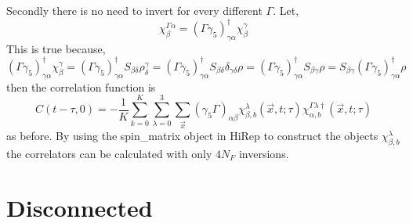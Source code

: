 \documentclass[3p,preprint]{elsarticle}
\begin{document}
Secondly there is no need to invert for every different $\Gamma$.
Let,
\begin{equation}
\chi^{\Gamma \alpha}_\beta = (\Gamma \gamma_5)^\dagger_{\gamma \alpha} \chi^{\gamma}_\beta
\end{equation}
This is true because,
\begin{equation}
(\Gamma \gamma_5)^\dagger_{\gamma \alpha} \chi^{\gamma}_\beta = (\Gamma \gamma_5)^\dagger_{\gamma \alpha}
S_{\beta \delta} \rho^{\gamma}_\delta = (\Gamma \gamma_5)^\dagger_{\gamma \alpha}
S_{\beta \delta} \delta_{\gamma \delta} \rho = (\Gamma \gamma_5)^\dagger_{\gamma \alpha}
S_{\beta \gamma} \rho = S_{\beta \gamma} (\Gamma \gamma_5)^\dagger_{\gamma \alpha} \rho
\end{equation}
then the correlation function is
\begin{equation}
C(t - \tau, 0) = -\frac{1}{K} \sum_{k = 0}^{K} \sum_{\lambda = 0}^{3}\sum_{\vec{x} } (\gamma_5 \Gamma)_{\alpha \beta} \chi^{\lambda}_{\beta, b}(\vec{x}, t; \tau) \chi^{\Gamma \lambda \dagger}_{\alpha, b}(\vec{x}, t; \tau)
\end{equation}
as before. By using the spin\_matrix object in HiRep to construct the objects $\chi^{\lambda}_{\beta, b}$ the correlators can
be calculated with only $4 N_F$ inversions.


\section{Disconnected}
\end{document}
